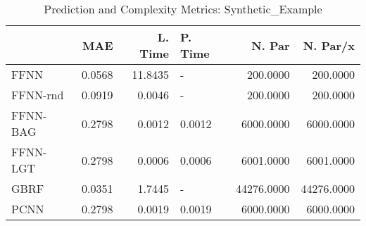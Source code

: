 \begin{table}
\centering
\caption{Prediction and Complexity Metrics: Synthetic_Example}
\label{tab__Synthetic_Example__Fix_Neurons_QTrue}
\begin{tabular}{lrrlrr}
\toprule
{} &    MAE &  L. Time & P. Time &     N. Par &   N. Par/x \\
\midrule
FFNN     & 0.0568 &  11.8435 &       - &   200.0000 &   200.0000 \\
FFNN-rnd & 0.0919 &   0.0046 &       - &   200.0000 &   200.0000 \\
FFNN-BAG & 0.2798 &   0.0012 &  0.0012 &  6000.0000 &  6000.0000 \\
FFNN-LGT & 0.2798 &   0.0006 &  0.0006 &  6001.0000 &  6001.0000 \\
GBRF     & 0.0351 &   1.7445 &       - & 44276.0000 & 44276.0000 \\
PCNN     & 0.2798 &   0.0019 &  0.0019 &  6000.0000 &  6000.0000 \\
\bottomrule
\end{tabular}
\end{table}
